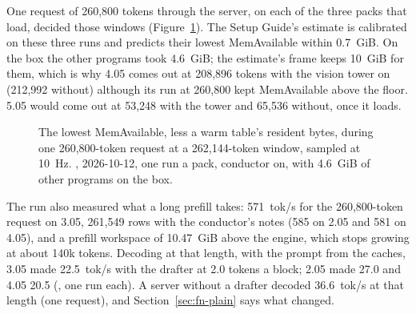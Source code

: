 One request of 260,800 tokens through the server, on each of the three packs that load, decided those windows (Figure~\ref{fig:fn-fit}). The Setup Guide's estimate is calibrated on these three runs and predicts their lowest MemAvailable within 0.7~GiB. On the box the other programs took 4.6~GiB; the estimate's frame keeps 10~GiB for them, which is why 4.05 comes out at 208,896 tokens with the vision tower on (212,992 without) although its run at 260,800 kept MemAvailable above the floor. 5.05 would come out at 53,248 with the tower and 65,536 without, once it loads.

\begin{figure}[htbp]
\centering
{}
\caption[The packs at a 262,144-token window]{The lowest MemAvailable, less a warm table's resident bytes, during one 260,800-token request at a 262,144-token window, sampled at 10~Hz. \measured, 2026-10-12, one run a pack, conductor on, with 4.6~GiB of other programs on the box.}\label{fig:fn-fit}
\end{figure}

The run also measured what a long prefill takes: 571~tok/s for the 260,800-token request on 3.05, 261,549 rows with the conductor's notes (585 on 2.05 and 581 on 4.05), and a prefill workspace of 10.47~GiB above the engine, which stops growing at about 140k tokens. Decoding at that length, with the prompt from the caches, 3.05 made 22.5~tok/s with the drafter at 2.0 tokens a block; 2.05 made 27.0 and 4.05 20.5 (\measured, one run each). A server without a drafter decoded 36.6~tok/s at that length (one request), and Section~\ref{sec:fn-plain} says what changed.

